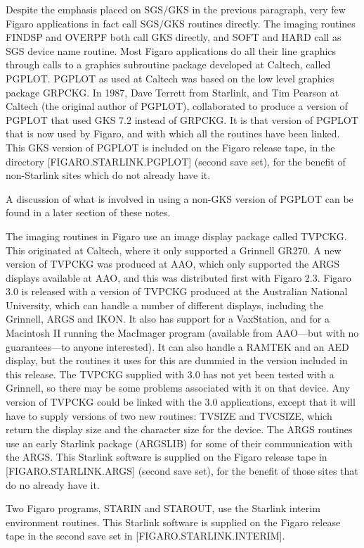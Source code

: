 Despite the emphasis placed on SGS/GKS in the previous paragraph, very few 
Figaro applications in fact call SGS/GKS routines directly. The imaging
routines FINDSP and OVERPF both call GKS directly, and SOFT and HARD  call as
SGS device name routine. Most Figaro applications do all their line graphics
through calls to a graphics subroutine package developed at  Caltech, called
PGPLOT. PGPLOT as used at Caltech was based on the low level  graphics package
GRPCKG. In 1987, Dave Terrett from Starlink, and Tim Pearson at Caltech (the
original author of PGPLOT), collaborated to produce  a version of PGPLOT that
used GKS 7.2 instead of GRPCKG. It is that version of PGPLOT that is now used
by Figaro, and with which all the  routines have been linked. This GKS version
of PGPLOT is included on the Figaro release tape, in the directory
[FIGARO.STARLINK.PGPLOT] (second save  set), for the benefit of non-Starlink
sites which do not already have it.

A discussion of what is involved in using a non-GKS version of PGPLOT can be
found in a later section of these notes.

The imaging routines in Figaro use an image display package called  TVPCKG.
This originated at Caltech, where it only supported a Grinnell GR270.  A new
version of TVPCKG was produced at AAO, which only supported the  ARGS displays
available at AAO, and this was distributed first with Figaro 2.3. Figaro 3.0 is
released with a version of TVPCKG produced at the Australian National
University, which can handle a number of different  displays, including the
Grinnell, ARGS and IKON. It also has support for a VaxStation, and for a
Macintosh II running the MacImager program (available from AAO---but with no
guarantees---to anyone interested). It can also handle a RAMTEK and an AED
display, but the routines it uses for this are dummied in the version included
in this release. The TVPCKG supplied with 3.0 has not yet been tested with a
Grinnell, so there may be some problems  associated with it on that device. Any
version of TVPCKG could be linked with the 3.0 applications, except that it
will have to supply versions of two new routines: TVSIZE and TVCSIZE, which
return the display size and the character size for the device. The ARGS
routines use an early  Starlink package (ARGSLIB) for some of their
communication with the ARGS. This Starlink software is supplied on the Figaro
release tape in [FIGARO.STARLINK.ARGS] (second save set), for the benefit of
those sites that do no already have it.

Two Figaro programs, STARIN and STAROUT, use the Starlink interim environment 
routines. This Starlink software is supplied on the Figaro release  tape in the
second save set  in [FIGARO.STARLINK.INTERIM].

